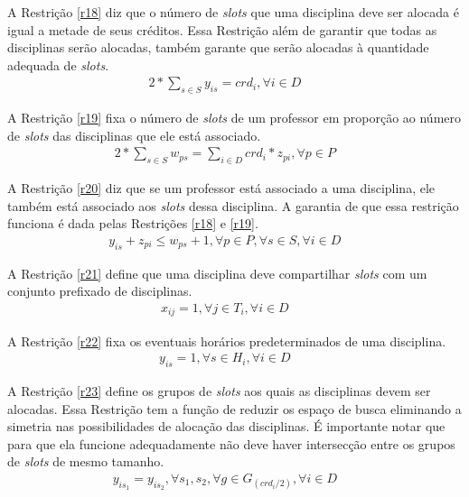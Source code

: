A Restrição \ref{r18} diz que o número de \textit{slots} que uma disciplina deve ser alocada é igual a metade de seus créditos. Essa Restrição além de garantir que todas as disciplinas serão alocadas, também garante que serão alocadas à quantidade adequada de \textit{slots}.
\begin{eqnarray}
\label{r18}
2*\sum_{s \in S}^{}{y_{is}} = crd_i, \forall{i}\in{D}  &&
\end{eqnarray}

A Restrição \ref{r19} fixa o número de \textit{slots} de um professor em proporção ao número de \textit{slots} das disciplinas que ele está associado.
\begin{eqnarray}
\label{r19}
2 * \sum_{s \in S}^{}{w_{ps}} = \sum_{i \in D}^{}{crd_i * z_{pi}}, \forall{p}\in{P} &&
\end{eqnarray}

A Restrição \ref{r20} diz que se um professor está associado a uma disciplina, ele também está associado aos \textit{slots} dessa disciplina. A garantia de que essa restrição funciona é dada pelas Restrições \ref{r18} e \ref{r19}. 
\begin{eqnarray}
\label{r20}
y_{is} + z_{pi} \le w_{ps} + 1, \forall{p}\in{P}, \forall{s}\in{S}, \forall{i}\in{D} &&
\end{eqnarray}

A Restrição \ref{r21} define que uma disciplina deve compartilhar \textit{slots} com um conjunto prefixado de disciplinas.
\begin{eqnarray}
\label{r21}
x_{ij} = 1, \forall{j\in{T_i}},\forall{i \in{D}} &&
\end{eqnarray}

A Restrição \ref{r22} fixa os eventuais horários predeterminados de uma disciplina.
\begin{eqnarray}
\label{r22}
y_{is} = 1, \forall{s \in{H_i}}, \forall{i \in{D}} &&
\end{eqnarray}

A Restrição \ref{r23} define os grupos de \textit{slots} aos quais as disciplinas devem ser alocadas. Essa Restrição tem a função de reduzir os espaço de busca eliminando a simetria nas possibilidades de alocação das disciplinas. É importante notar que para que ela funcione adequadamente não deve haver intersecção entre os grupos de \textit{slots} de mesmo tamanho.
\begin{eqnarray}
\label{r23}
y_{is_1} = y_{is_2}, \forall{s_1, s_2}, \forall{g\in{G_{(crd_i/2)}}}, \forall{i\in{D}} &&
\end{eqnarray}

